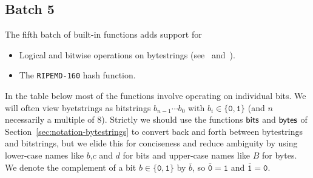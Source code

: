 \renewcommand{\note}[1]{
  \bigskip
  \refstepcounter{notenumberE}
  \noindent\textbf{Note \thenotenumberE. #1}
}

\newcommand\Xand{\mathsf{and}}
\newcommand\Xor{\mathsf{or}}
\newcommand\Xxor{\mathsf{xor}}
\newcommand{\bitzero}{\mathtt{0}}
\newcommand{\bitone}{\mathtt{1}}
\newcommand{\trunc}{\mathbf{\mathsf{trunc}}}
\newcommand{\ext}{\mathbf{\textsf{ext}}}

\subsection{Batch 5}
\label{sec:default-builtins-5}
The fifth batch of built-in functions adds support for
\begin{itemize}
\item Logical and bitwise operations on bytestrings (see~\cite{CIP-0122} and~\cite{CIP-0123}).
\item The \texttt{RIPEMD-160} hash function.
\end{itemize}

\noindent In the table below most of the functions involve operating on individual bits.
We will often view byetstrings as bitstrings $b_{n-1}\cdots b_0$ with
$b_i \in \{\bitzero,\bitone\}$ (and $n$ necessarily a multiple of 8).  Strictly
we should use the functions $\mathsf{bits}$ and $\mathsf{bytes}$ of
Section~\ref{sec:notation-bytestrings} to convert back and forth between
bytestrings and bitstrings, but we elide this for conciseness and reduce
ambiguity by using lower-case names like $b$,$c$ and $d$ for bits and upper-case
names like $B$ for bytes. We denote the complement of a bit
$b \in \{\bitzero,\bitone\}$ by $\bar{b}$, so $\bar{\bitzero} = \bitone$ and
$\bar{\bitone} = \bitzero$.


